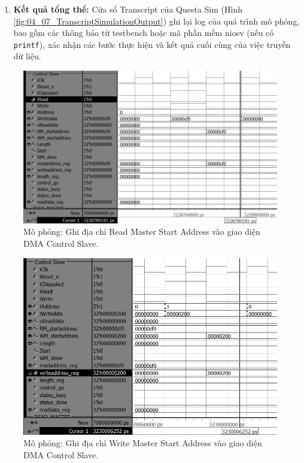 \begin{enumerate}
    \item \textbf{Kết quả tổng thể:} Cửa sổ Transcript của Questa Sim (Hình \ref{fig:04_07_TranscriptSimulationOutput}) ghi lại log của quá trình mô phỏng, bao gồm các thông báo từ testbench hoặc mã phần mềm \acrshort{niosv} (nếu có \texttt{printf}), xác nhận các bước thực hiện và kết quả cuối cùng của việc truyền dữ liệu.
\end{enumerate}

\begin{figure}[htbp]
    \centering
    \includegraphics[width=0.7\linewidth]{Images/04_01_ControlSlave_Write_RM_startaddress.png} %
    \caption{Mô phỏng: Ghi địa chỉ Read Master Start Address vào giao diện DMA Control Slave.}
    \label{fig:04_01_ControlSlave_Write_RM_startaddress}
\end{figure}

\begin{figure}[htbp]
    \centering
    \includegraphics[width=0.8\linewidth]{Images/04_02_ControlSlave_Write_WM_startaddress.png} %
    \caption{Mô phỏng: Ghi địa chỉ Write Master Start Address vào giao diện DMA Control Slave.}
    \label{fig:04_02_ControlSlave_Write_WM_startaddress}
\end{figure}

